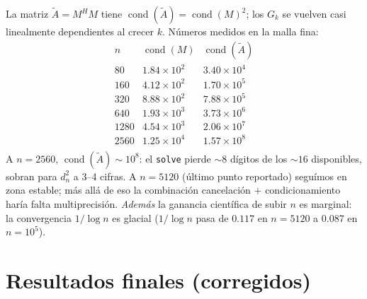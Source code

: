 \documentclass[11pt]{article}
\newcommand{\code}[1]{\texttt{#1}}
\begin{document}
La matriz $\tilde A=M^HM$ tiene $\operatorname{cond}(\tilde A)=\operatorname{cond}(M)^2$;
los $G_k$ se vuelven casi linealmente dependientes al crecer $k$. N\'umeros medidos en
la malla fina:
\[
\begin{array}{r|cc}
n & \operatorname{cond}(M) & \operatorname{cond}(\tilde A)\\
\hline
80   & 1.84\times10^{2} & 3.40\times10^{4}\\
160  & 4.12\times10^{2} & 1.70\times10^{5}\\
320  & 8.88\times10^{2} & 7.88\times10^{5}\\
640  & 1.93\times10^{3} & 3.73\times10^{6}\\
1280 & 4.54\times10^{3} & 2.06\times10^{7}\\
2560 & 1.25\times10^{4} & 1.57\times10^{8}\\
\end{array}
\]
A $n=2560$, $\operatorname{cond}(\tilde A)\sim10^{8}$: el \code{solve} pierde $\sim8$
d\'igitos de los $\sim16$ disponibles, sobran para $d_n^2$ a 3--4 cifras. A
$n=5120$ (\'ultimo punto reportado) segu\'imos en zona estable; m\'as all\'a de eso
la combinaci\'on cancelaci\'on $+$ condicionamiento har\'ia falta multiprecisi\'on.
\emph{Adem\'as} la ganancia cient\'ifica de subir $n$ es marginal: la convergencia
$1/\log n$ es glacial ($1/\log n$ pasa de $0.117$ en $n{=}5120$ a $0.087$ en $n{=}10^5$).

\section{Resultados finales (corregidos)}
\label{sec:result}
\end{document}
